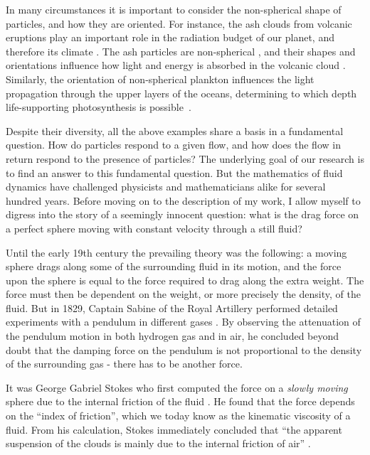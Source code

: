 \documentclass[thesis.tex]{subfiles}
\begin{document}
In many circumstances it is important to consider the non-spherical shape of particles, and how they are oriented. For instance, the ash clouds from volcanic eruptions play an important role in the radiation budget of our planet, and therefore its climate \cite{mather2003}. The ash particles are non-spherical \cite{gasteiger2011}, and their shapes and orientations influence how light and energy is absorbed in the volcanic cloud \cite{dubovik2002}. Similarly, the orientation of non-spherical plankton influences the light propagation through the upper layers of the oceans, determining to which depth life-supporting photosynthesis is possible~\cite{marcos2011}. 

Despite their diversity, all the above examples share a basis in a fundamental question. How do particles respond to a given flow, and how does the flow in return respond to the presence of particles? The underlying goal of our research is to find an answer to this fundamental question.
But the mathematics of fluid dynamics have challenged physicists and mathematicians alike for several hundred years. Before moving on to the description of my work, I allow myself to digress into the story of a seemingly innocent question: what is the drag force on a perfect sphere moving with constant velocity through a still fluid?

Until the early 19th century the prevailing theory was the following: a moving sphere drags along some of the surrounding fluid in its motion, and the force upon the sphere is equal to the force required to drag along the extra weight. The force must then be dependent on the weight, or more precisely the density, of the fluid. But in 1829, Captain Sabine of the Royal Artillery performed detailed experiments with a pendulum in different gases \cite{sabine1829}. By observing the attenuation of the pendulum motion in both hydrogen gas and in air, he concluded beyond doubt that the damping force on the pendulum is not proportional to the density of the surrounding gas - there has to be another force.

It was George Gabriel Stokes who first computed the force on a \emph{slowly moving
} sphere due to the internal friction of the fluid \cite{stokes1851}. He found that the force depends on the ``index of friction'', which we today know as the kinematic viscosity of a fluid. From his calculation, Stokes immediately concluded that ``the apparent suspension of the clouds is mainly due to the internal friction of air'' \cite{stokes1851}.
\end{document}
